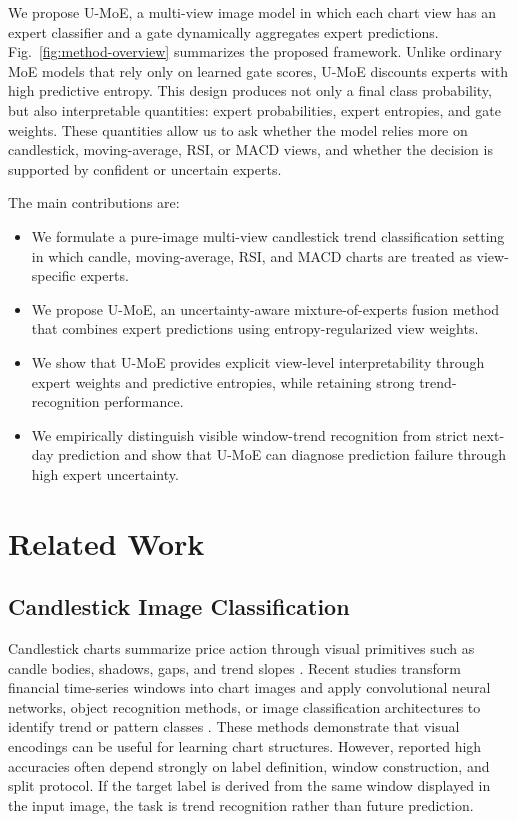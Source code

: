 ﻿\documentclass[conference]{IEEEtran}
\newcommand{\method}{U-MoE}
\begin{document}
We propose \method{}, a multi-view image model in which each chart view has an expert classifier and a gate dynamically aggregates expert predictions. Fig.~\ref{fig:method-overview} summarizes the proposed framework. Unlike ordinary MoE models that rely only on learned gate scores, \method{} discounts experts with high predictive entropy. This design produces not only a final class probability, but also interpretable quantities: expert probabilities, expert entropies, and gate weights. These quantities allow us to ask whether the model relies more on candlestick, moving-average, RSI, or MACD views, and whether the decision is supported by confident or uncertain experts.

The main contributions are:
\begin{itemize}
    \item We formulate a pure-image multi-view candlestick trend classification setting in which candle, moving-average, RSI, and MACD charts are treated as view-specific experts.
    \item We propose \method{}, an uncertainty-aware mixture-of-experts fusion method that combines expert predictions using entropy-regularized view weights.
    \item We show that \method{} provides explicit view-level interpretability through expert weights and predictive entropies, while retaining strong trend-recognition performance.
    \item We empirically distinguish visible window-trend recognition from strict next-day prediction and show that \method{} can diagnose prediction failure through high expert uncertainty.
\end{itemize}

\section{Related Work}

\subsection{Candlestick Image Classification}
Candlestick charts summarize price action through visual primitives such as candle bodies, shadows, gaps, and trend slopes \cite{mersal2023systematic}. Recent studies transform financial time-series windows into chart images and apply convolutional neural networks, object recognition methods, or image classification architectures to identify trend or pattern classes \cite{kusuma2019deepcandle,pizon2025image,nguyen2023object,temur2024comparison}. These methods demonstrate that visual encodings can be useful for learning chart structures. However, reported high accuracies often depend strongly on label definition, window construction, and split protocol. If the target label is derived from the same window displayed in the input image, the task is trend recognition rather than future prediction.
\end{document}
